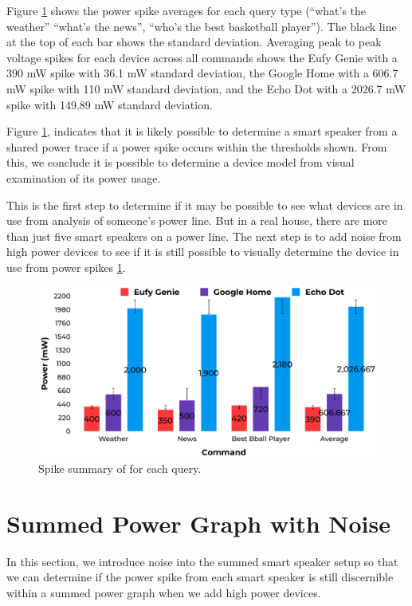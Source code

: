 Figure \ref{fig:spikeVoltages} shows the power spike averages for each query type (``what's the weather'' ``what's the news'', ``who's the best basketball player''). The black line at the top of each bar shows the standard deviation. Averaging peak to peak voltage spikes for each device across all commands shows the Eufy Genie with a 390 mW spike with 36.1 mW standard deviation, the Google Home with a 606.7 mW spike with 110 mW standard deviation, and the Echo Dot with a 2026.7 mW spike with 149.89 mW standard deviation.

Figure \ref{fig:spikeVoltages}, indicates that it is likely possible to determine a smart speaker from a shared power trace if a power spike occurs within the thresholds shown. From this, we conclude it is possible to determine a device model from visual examination of its power usage.

This is the first step to determine if it may be possible to see what devices are in use from analysis of someone's power line. But in a real house, there are more than just five smart speakers on a power line. The next step is to add noise from high power devices to see if it is still possible to visually determine the device in use from power spikes \ref{sumPowerGraphWithNoise}.

\begin{figure}[H]
  \centering
  \includegraphics[width=1\textwidth]{figures/spikeVoltages.png}
  \caption{Spike summary of for each query.}
  \label{fig:spikeVoltages}
\end{figure}

\section{Summed Power Graph with Noise}
\label{sumPowerGraphWithNoise}
In this section, we introduce noise into the summed smart speaker setup so that we can determine if the power spike from each smart speaker is still discernible within a summed power graph when we add high power devices.

